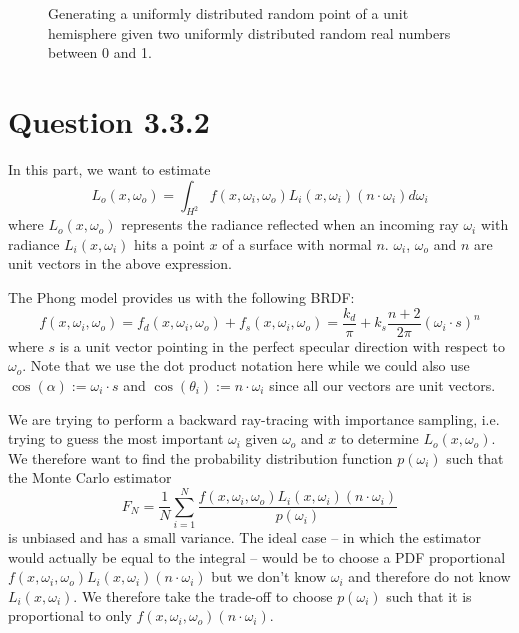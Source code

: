 \documentclass{article}
\begin{document}
\begin{figure}[h]
\centering
{}
\caption{Generating a uniformly distributed random point of a unit hemisphere given two uniformly distributed random real numbers between 0 and 1.}
\label{fig:hemisphere}
\end{figure}

\section*{Question 3.3.2}
In this part, we want to estimate
$$
L_o(x, \omega_o) = \int_{H^2}f(x, \omega_i, \omega_o)L_i(x, \omega_i)(n \cdot \omega_i)d\omega_i
$$
where $L_o(x, \omega_o)$ represents the radiance reflected when an incoming ray $\omega_i$ with radiance $L_i(x, \omega_i)$ hits a point $x$ of a surface with normal $n$. $\omega_i$, $\omega_o$ and $n$ are unit vectors in the above expression.

The Phong model provides us with the following BRDF:
$$
f(x, \omega_i, \omega_o) = f_d(x, \omega_i, \omega_o) + f_s(x, \omega_i, \omega_o) = \frac{k_d}{\pi} + k_s\frac{n + 2}{2\pi}(\omega_i \cdot s)^n
$$
where $s$ is a unit vector pointing in the perfect specular direction with respect to $\omega_o$. Note that we use the dot product notation here while we could also use $\cos{(\alpha)} := \omega_i \cdot s$ and $\cos{(\theta_i)} := n \cdot \omega_i$ since all our vectors are unit vectors.

We are trying to perform a backward ray-tracing with importance sampling, i.e. trying to guess the most important $\omega_i$ given $\omega_o$ and $x$ to determine $L_o(x, \omega_o)$. We therefore want to find the probability distribution function $p(\omega_i)$ such that the Monte Carlo estimator
$$F_N = \frac{1}{N}\sum\limits_{i=1}^N\frac{f(x, \omega_i, \omega_o)L_i(x, \omega_i)(n \cdot \omega_i)}{p(\omega_i)}
$$
is unbiased and has a small variance. The ideal case -- in which the estimator would actually be equal to the integral -- would be to choose a PDF proportional $f(x, \omega_i, \omega_o)L_i(x, \omega_i)(n \cdot \omega_i)$ but we don't know $\omega_i$ and therefore do not know $L_i(x, \omega_i)$. We therefore take the trade-off to choose $p(\omega_i)$ such that it is proportional to only $f(x, \omega_i, \omega_o)(n \cdot \omega_i)$.
\end{document}
